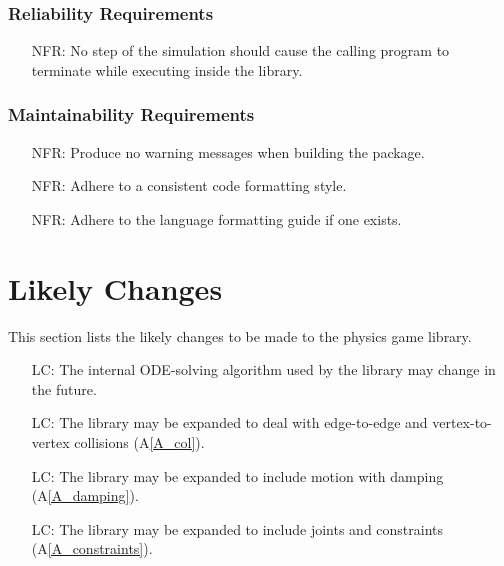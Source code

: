 \documentclass[12pt]{article}
\newcounter{nfrnum} %
\newcounter{lcnum} %
\begin{document}
\subsubsection{Reliability Requirements}

\begin{itemize}
\item[NFR\refstepcounter{nfrnum}\thenfrnum \label{NFR_CrashAdverse}:] No step of the simulation should cause the calling program to terminate while executing inside the library.
\end{itemize}

\subsubsection{Maintainability Requirements}

\begin{itemize}
\item[NFR\refstepcounter{nfrnum}\thenfrnum \label{NFR_CleanCode}:] Produce no warning messages when building the package.
\item[NFR\refstepcounter{nfrnum}\thenfrnum \label{NFR_UniformCode}:] Adhere to a consistent code formatting style.
\item[NFR\refstepcounter{nfrnum}\thenfrnum \label{NFR_PredictableCode}:] Adhere to the language formatting guide if one exists.
\end{itemize}


%
%

\section{Likely Changes}    
\label{sec_likechan}

This section lists the likely changes to be made to the physics game library.

\begin{itemize}
	\item[LC\refstepcounter{lcnum}\thelcnum\label{LC_solver}:] The internal ODE-solving algorithm used by the library may change in the future.
	\item[LC\refstepcounter{lcnum}\thelcnum\label{LC_collisions}:] The library may be expanded to deal with edge-to-edge and vertex-to-vertex collisions (A\ref{A_col}).
	\item[LC\refstepcounter{lcnum}\thelcnum\label{LC_damping}:] The library may be expanded to include motion with damping (A\ref{A_damping}).
	\item[LC\refstepcounter{lcnum}\thelcnum\label{LC_constraints}:] The library may be expanded to include joints and constraints (A\ref{A_constraints}).
\end{itemize}
\end{document}
